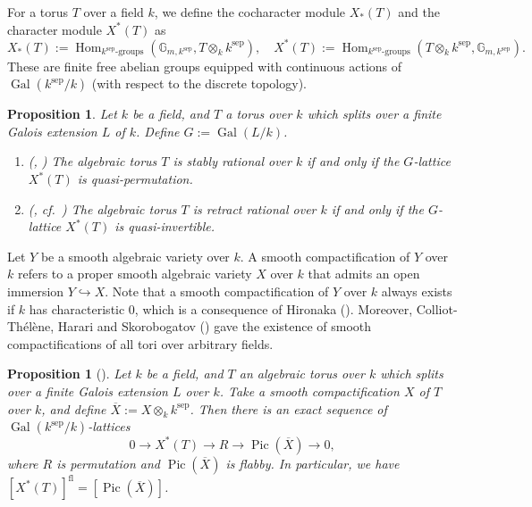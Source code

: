 \documentclass[12pt]{amsart}
\theoremstyle{plain}
\newtheorem{prop}[thm]{Proposition}
\theoremstyle{definition}
\numberwithin{thm}{section}
\numberwithin{equation}{section}
\newcommand{\G}{\mathbb{G}}
\DeclareMathOperator{\Hom}{Hom}
\DeclareMathOperator{\Gal}{Gal}
\DeclareMathOperator{\Pic}{Pic}
\DeclareMathOperator{\sep}{sep}
\DeclareMathOperator{\fl}{fl}
\begin{document}
For a torus $T$ over a field $k$, we define the cocharacter module $X_{*}(T)$ and the character module $X^{*}(T)$ as
\begin{equation*}
X_{*}(T):=\Hom_{k^{\sep}\text{-groups}}(\G_{m,k^{\sep}},T\otimes_{k}k^{\sep}),\quad 
X^{*}(T):=\Hom_{k^{\sep}\text{-groups}}(T\otimes_{k}k^{\sep},\G_{m,k^{\sep}}). 
\end{equation*}
These are finite free abelian groups equipped with continuous actions of $\Gal(k^{\sep}/k)$ (with respect to the discrete topology). 

\begin{prop}
\label{prop:rtiv}
Let $k$ be a field, and $T$ a torus over $k$ which splits over a finite Galois extension $L$ of $k$. Define $G:=\Gal(L/k)$. %
\begin{enumerate}
\item \emph{(\cite[Theorem 1.6]{Endo1973}, \cite[Proposition 9.5.3]{Lorenz2005})} The algebraic torus $T$ is stably rational over $k$ if and only if the $G$-lattice $X^{*}(T)$ is quasi-permutation. 
\item \emph{(\cite[Proposition 9.5.4]{Lorenz2005}, cf.~\cite[Theorem 3.14]{Saltman1984})} The algebraic torus $T$ is retract rational over $k$ if and only if the $G$-lattice $X^{*}(T)$ is quasi-invertible. 
\end{enumerate}
\end{prop}

Let $Y$ be a smooth algebraic variety over $k$. A smooth compactification of $Y$ over $k$ refers to a proper smooth algebraic variety $X$ over $k$ that admits an open immersion $Y\hookrightarrow X$. Note that a smooth compactification of $Y$ over $k$ always exists if $k$ has characteristic $0$, which is a consequence of Hironaka (\cite{Hironaka1964}). Moreover, Colliot-Th{\'e}l{\`e}ne, Harari and Skorobogatov (\cite{ColliotThelene2005}) gave the existence of smooth compactifications of all tori over arbitrary fields. 

\begin{prop}[{\cite[Section 4, p.~1213]{Voskresenskii1969}}]\label{prop:flpc}
Let $k$ be a field, and $T$ an algebraic torus over $k$ which splits over a finite Galois extension $L$ over $k$. Take a smooth compactification $X$ of $T$ over $k$, and define $\overline{X}:=X\otimes_{k}k^{\sep}$. Then there is an exact sequence of $\Gal(k^{\sep}/k)$-lattices
\begin{equation*}
    0\rightarrow X^{*}(T)\rightarrow R \rightarrow \Pic(\overline{X})\rightarrow 0, 
\end{equation*}
where $R$ is permutation and $\Pic(\overline{X})$ is flabby. In particular, we have $[X^{*}(T)]^{\fl}=[\Pic(\overline{X})]$. 
\end{prop}
\end{document}

